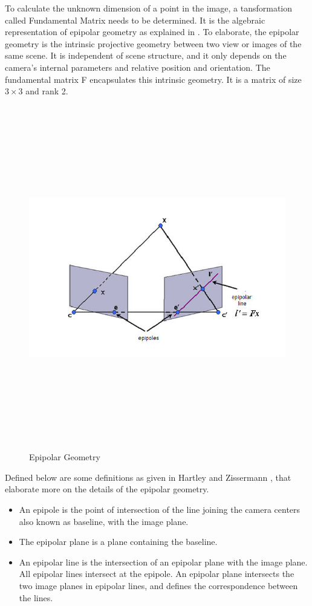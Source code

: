 To calculate the unknown dimension of a point in the image, a tansformation called Fundamental Matrix needs to be determined. It is the algebraic representation of epipolar geometry as explained in \cite{hartley2003multiple}. To elaborate, the epipolar geometry is the intrinsic projective geometry between two view or images of the same scene. It is independent of scene structure, and it only depends on the camera's internal parameters and relative position and orientation. The fundamental matrix F encapsulates this intrinsic geometry. It is a matrix of size \(3{\times}3\) and rank 2. 
\begin{figure} [htb!] 
    \centering
    \includegraphics[width=15cm,height=15cm,keepaspectratio]{Pictures/epipolar.png}
    \caption{Epipolar Geometry}
    \label{figure:epi}
\end{figure}
 Defined below are some definitions as given in Hartley and Zissermann \cite{hartley2003multiple}, that elaborate more on the details of the epipolar geometry.
\begin{itemize}
\item  An epipole is the point of intersection of the line joining the camera centers also known as baseline, with the image plane. 
\item  The epipolar plane is a plane containing the baseline. 
\item  An epipolar line is the intersection of an epipolar plane with the image plane.
All epipolar lines intersect at the epipole. An epipolar plane intersects the two image planes in epipolar lines,
 and defines the correspondence between the lines.
\end{itemize}


